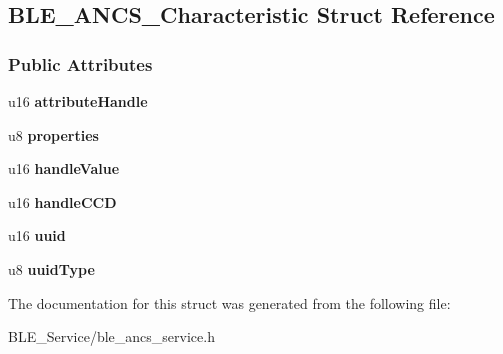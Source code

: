 \hypertarget{struct_b_l_e___a_n_c_s___characteristic}{}\subsection{B\+L\+E\+\_\+\+A\+N\+C\+S\+\_\+\+Characteristic Struct Reference}
\label{struct_b_l_e___a_n_c_s___characteristic}
\subsubsection*{Public Attributes}
\begin{DoxyCompactItemize}
\item 
u16 {\bfseries attribute\+Handle}\hypertarget{struct_b_l_e___a_n_c_s___characteristic_ad4db89e7c6f98cf7d33b300b21da2f30}{}\label{struct_b_l_e___a_n_c_s___characteristic_ad4db89e7c6f98cf7d33b300b21da2f30}

\item 
u8 {\bfseries properties}\hypertarget{struct_b_l_e___a_n_c_s___characteristic_a13b4c1b3fa394f361a74fc9b9f13b4e8}{}\label{struct_b_l_e___a_n_c_s___characteristic_a13b4c1b3fa394f361a74fc9b9f13b4e8}

\item 
u16 {\bfseries handle\+Value}\hypertarget{struct_b_l_e___a_n_c_s___characteristic_ae522eb7561820b7700d69288bf356232}{}\label{struct_b_l_e___a_n_c_s___characteristic_ae522eb7561820b7700d69288bf356232}

\item 
u16 {\bfseries handle\+C\+CD}\hypertarget{struct_b_l_e___a_n_c_s___characteristic_a4b4a19304afb665defffafff103e6b4b}{}\label{struct_b_l_e___a_n_c_s___characteristic_a4b4a19304afb665defffafff103e6b4b}

\item 
u16 {\bfseries uuid}\hypertarget{struct_b_l_e___a_n_c_s___characteristic_aa030f16f6cbf8dd8f6e19b900da20012}{}\label{struct_b_l_e___a_n_c_s___characteristic_aa030f16f6cbf8dd8f6e19b900da20012}

\item 
u8 {\bfseries uuid\+Type}\hypertarget{struct_b_l_e___a_n_c_s___characteristic_af2accc75edeca02670b221180e6effff}{}\label{struct_b_l_e___a_n_c_s___characteristic_af2accc75edeca02670b221180e6effff}

\end{DoxyCompactItemize}


The documentation for this struct was generated from the following file\+:\begin{DoxyCompactItemize}
\item 
B\+L\+E\+\_\+\+Service/ble\+\_\+ancs\+\_\+service.\+h\end{DoxyCompactItemize}
